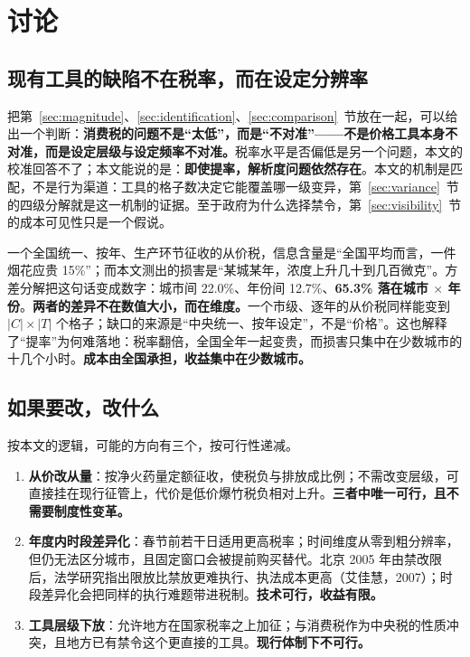 \section{讨论}

\subsection{现有工具的缺陷不在税率，而在设定分辨率}

把第~\ref{sec:magnitude}、\ref{sec:identification}、\ref{sec:comparison}~节放在一起，可以给出一个判断：\textbf{消费税的问题不是“太低”，而是“不对准”——不是价格工具本身不对准，而是设定层级与设定频率不对准。}税率水平是否偏低是另一个问题，本文的校准回答不了；本文能说的是：\textbf{即使提率，解析度问题依然存在}。本文的机制是匹配，不是行为渠道：工具的格子数决定它能覆盖哪一级变异，第~\ref{sec:variance}~节的四级分解就是这一机制的证据。至于政府为什么选择禁令，第~\ref{sec:visibility}~节的成本可见性只是一个假说。

一个全国统一、按年、生产环节征收的从价税，信息含量是“全国平均而言，一件烟花应贵 15\%”；而本文测出的损害是“某城某年，浓度上升几十到几百微克”。方差分解把这句话变成数字：城市间 22.0\%、年份间 12.7\%、\textbf{65.3\% 落在城市 $\times$ 年份}。\textbf{两者的差异不在数值大小，而在维度。}一个市级、逐年的从价税同样能变到 $|C|\times|T|$ 个格子；缺口的来源是“中央统一、按年设定”，不是“价格”。这也解释了“提率”为何难落地：税率翻倍，全国全年一起变贵，而损害只集中在少数城市的十几个小时。\textbf{成本由全国承担，收益集中在少数城市。}

\subsection{如果要改，改什么}\label{sec:options}

按本文的逻辑，可能的方向有三个，按可行性递减。

\begin{enumerate}
  \item \textbf{从价改从量}：按净火药量定额征收，使税负与排放成比例；不需改变层级，可直接挂在现行征管上，代价是低价爆竹税负相对上升。\textbf{三者中唯一可行，且不需要制度性变革。}
  \item \textbf{年度内时段差异化}：春节前若干日适用更高税率；时间维度从零到粗分辨率，但仍无法区分城市，且固定窗口会被提前购买替代。北京 2005 年由禁改限后，法学研究指出限放比禁放更难执行、执法成本更高（艾佳慧，2007）；时段差异化会把同样的执行难题带进税制。\textbf{技术可行，收益有限。}
  \item \textbf{工具层级下放}：允许地方在国家税率之上加征；与消费税作为中央税的性质冲突，且地方已有禁令这个更直接的工具。\textbf{现行体制下不可行。}
\end{enumerate}


